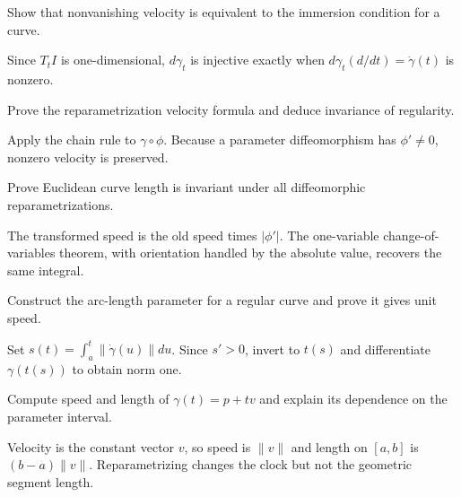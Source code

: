 \begin{problem}\label{prob:vii12-01}
Show that nonvanishing velocity is equivalent to the immersion condition for a curve.
\end{problem}
\begin{solution}
Since $T_tI$ is one-dimensional, $d\gamma_t$ is injective exactly when $d\gamma_t(d/dt)=\dot\gamma(t)$ is nonzero.
\end{solution}

\begin{problem}\label{prob:vii12-02}
Prove the reparametrization velocity formula and deduce invariance of regularity.
\end{problem}
\begin{solution}
Apply the chain rule to $\gamma\circ\phi$. Because a parameter diffeomorphism has $\phi'\ne0$, nonzero velocity is preserved.
\end{solution}

\begin{problem}\label{prob:vii12-03}
Prove Euclidean curve length is invariant under all diffeomorphic reparametrizations.
\end{problem}
\begin{solution}
The transformed speed is the old speed times $|\phi'|$. The one-variable change-of-variables theorem, with orientation handled by the absolute value, recovers the same integral.
\end{solution}

\begin{problem}\label{prob:vii12-04}
Construct the arc-length parameter for a regular curve and prove it gives unit speed.
\end{problem}
\begin{solution}
Set $s(t)=\int_a^t\|\dot\gamma(u)\|du$. Since $s'>0$, invert to $t(s)$ and differentiate $\gamma(t(s))$ to obtain norm one.
\end{solution}

\begin{problem}\label{prob:vii12-05}
Compute speed and length of $\gamma(t)=p+tv$ and explain its dependence on the parameter interval.
\end{problem}
\begin{solution}
Velocity is the constant vector $v$, so speed is $\|v\|$ and length on $[a,b]$ is $(b-a)\|v\|$. Reparametrizing changes the clock but not the geometric segment length.
\end{solution}

